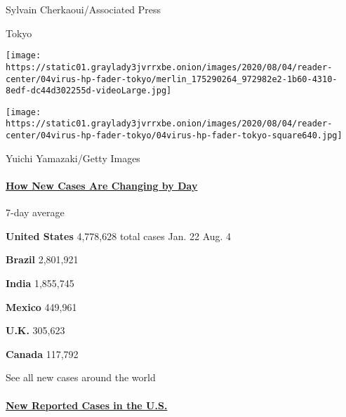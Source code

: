 Sylvain Cherkaoui/Associated Press

Tokyo

\texttt{[image: https://static01.graylady3jvrrxbe.onion/images/2020/08/04/reader-center/04virus-hp-fader-tokyo/merlin\_175290264\_972982e2-1b60-4310-8edf-dc44d302255d-videoLarge.jpg]}

\texttt{[image: https://static01.graylady3jvrrxbe.onion/images/2020/08/04/reader-center/04virus-hp-fader-tokyo/04virus-hp-fader-tokyo-square640.jpg]}

Yuichi Yamazaki/Getty Images

\hypertarget{how-new-cases-are-changing-by-day}{%
\paragraph{\texorpdfstring{\href{https://www.nytimes3xbfgragh.onion/interactive/2020/world/coronavirus-maps.html}{How
New Cases Are Changing by
Day}}{How New Cases Are Changing by Day}}\label{how-new-cases-are-changing-by-day}}

\href{https://www.nytimes3xbfgragh.onion/interactive/2020/us/coronavirus-us-cases.html}{}

7-day average

\textbf{United States} 4,778,628 total cases Jan. 22 Aug.
4\href{https://www.nytimes3xbfgragh.onion/interactive/2020/world/americas/brazil-coronavirus-cases.html}{}

\textbf{Brazil} 2,801,921
\href{https://www.nytimes3xbfgragh.onion/interactive/2020/world/asia/india-coronavirus-cases.html}{}

\textbf{India} 1,855,745
\href{https://www.nytimes3xbfgragh.onion/interactive/2020/world/americas/mexico-coronavirus-cases.html}{}

\textbf{Mexico} 449,961
\href{https://www.nytimes3xbfgragh.onion/interactive/2020/world/europe/united-kingdom-coronavirus-cases.html}{}

\textbf{U.K.} 305,623
\href{https://www.nytimes3xbfgragh.onion/interactive/2020/world/canada/canada-coronavirus-cases.html}{}

\textbf{Canada} 117,792

\href{https://www.nytimes3xbfgragh.onion/interactive/2020/world/coronavirus-maps.html}{}

See all new cases around the world

\hypertarget{new-reported-cases-in-the-us}{%
\paragraph{\texorpdfstring{\href{https://www.nytimes3xbfgragh.onion/interactive/2020/us/coronavirus-us-cases.html}{New
Reported Cases in the
U.S.}}{New Reported Cases in the U.S.}}\label{new-reported-cases-in-the-us}}

